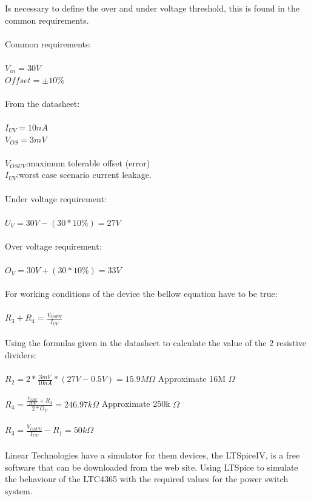 Is necessary to define the over and under voltage threshold, this is found in the common requirements.\\
\\
Common requirements:\\\\
$V_{in} = 30V$ \\
$Offset = \pm 10\% $\\
\\
From the datasheet:\\\\
$ I_{UV} = 10nA $ \\
$ V_{OS} = 3mV $\\
\\
$V_{OSUV}$:maximum tolerable offset (error)\\
$I_{UV}$:worst case scenario current leakage.\\
\\
Under voltage requirement:\\\\
$ U_V=30V-(30*10\%)=27V $\\
\\
Over voltage requirement:\\\\
$ O_V=30V+(30*10\%)=33V $\\
\\
For working conditions of the device the bellow equation have to be true:\\\\
$ R_3+R_4=\frac{V_{OSUV}}{I_{UV}} $\\
\\
Using the formulas given in the datasheet to calculate the value of the 2 resistive dividers:\\\\
$ R_2 = 2*\frac{3mV}{10nA}*(27V-0.5V) = 15.9M\Omega $ Approximate 16M $\Omega $\\ 
\\
$ R_4 = \frac{\frac{V_{OSIU}}{I{UV}}+R_3}{2*O_V} = 246.97k\Omega $ Approximate 250k $\Omega $\\ 
\\
$ R_3 = \frac{V_{OSUV}}{I_{UV}}-R_1 = 50k\Omega $\\
\\

Linear Technologies have a simulator for them devices, the LTSpiceIV, is a free software that can be downloaded from the web site.
Using LTSpice to simulate the behaviour of the LTC4365 with the required values for the power switch system.

